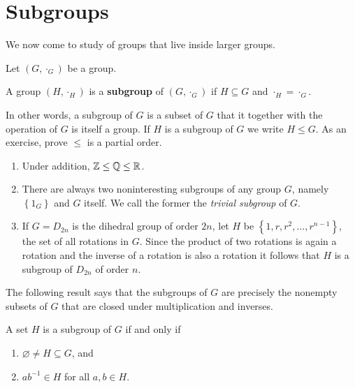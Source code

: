 \documentclass[11pt,a4paper]{article}
\begin{document}
\section{Subgroups}




We now come to study of groups that live inside larger groups.

Let \((G,\cdot_G)\) be a group.

\begin{defi}
    A group \((H,\cdot_H)\) is a \textbf{subgroup} of    \((G,\cdot_G)\) if \(H\subseteq G\) and \(\cdot_H = \cdot_G\).
    
\end{defi}

In other words, a subgroup of \(G\) is a subset of \(G\) that it together with the operation of \(G\) is itself a group.
If \(H\) is a subgroup of \(G\) we write \(H\leq G\).
As an exercise, prove \(\leq \) is a partial order.

\begin{exa}
\begin{enumerate}[label=(\roman*)]
    \item Under addition, \(\mathbb{Z}\leq  \mathbb{Q} \leq  \mathbb{R} \).
    \item There are always two noninteresting subgroups of any group \(G\), namely \(\left\{ 1_G \right\}\) and \(G\) itself.
    We call the former the \textit{trivial subgroup} of \(G\).
    \item If $G=D_{2 n}$ is the dihedral group of order $2 n$, let $H$ be $\left\{1, r, r^2, \ldots, r^{n-1}\right\}$, the set of all rotations in $G$. Since the product of two rotations is again a rotation and the inverse of a rotation is also a rotation it follows that $H$ is a subgroup of $D_{2 n}$ of order $n$.
\end{enumerate}
\end{exa}


The following result says that the subgroups of \(G\) are precisely the nonempty subsets of \(G\) that are closed under multiplication and inverses.

\begin{lem}\label{lem:subgroup.criterion}
    A set \(H\) is a subgroup of \(G\) if and only if 
    \begin{enumerate}[label=(\roman*)]
        \item \(\varnothing\neq  H \subseteq G \), and 
        \item \(ab^{-1}\in H\) for all \(a,b\in H\).
    \end{enumerate}
\end{lem}
\end{document}

